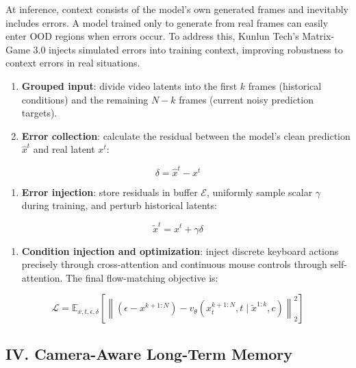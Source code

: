 At inference, context consists of the model's own generated frames and inevitably includes errors. A model trained only to generate from real frames can easily enter OOD regions when errors occur. To address this, Kunlun Tech's Matrix-Game 3.0 injects simulated errors into training context, improving robustness to context errors in real situations.

\begin{enumerate}
\def\labelenumi{\arabic{enumi}.}
\item
  \textbf{Grouped input}: divide video latents into the first \(k\) frames (historical conditions) and the remaining \(N-k\) frames (current noisy prediction targets).
\item
{}
  \textbf{Error collection}: calculate the residual between the model's clean prediction \(\hat{x}^t\) and real latent \(x^t\):
\end{enumerate}

\[
\delta = \hat{x}^t - x^t
\]

\begin{enumerate}
\def\labelenumi{\arabic{enumi}.}
\setcounter{enumi}{2}
\tightlist
\item
{}
  \textbf{Error injection}: store residuals in buffer \(\mathcal{E}\), uniformly sample scalar \(\gamma\) during training, and perturb historical latents:
\end{enumerate}

\[
\tilde{x}^t = x^t + \gamma\delta
\]

\begin{enumerate}
\def\labelenumi{\arabic{enumi}.}
\setcounter{enumi}{3}
\tightlist
\item
{}
  \textbf{Condition injection and optimization}: inject discrete keyboard actions precisely through cross-attention and continuous mouse controls through self-attention. The final flow-matching objective is:
\end{enumerate}

\[
\mathcal{L} = \mathbb{E}_{x,t,\epsilon,\delta}\left[\left\|\left(\epsilon - x^{k+1:N}\right) - v_{\theta}\left(x_t^{k+1:N}, t\mid \tilde{x}^{1:k}, c\right)\right\|_2^2\right]
\]

\hypertarget{iv.-camera-aware-long-term-memory}{%
\subsection{IV. Camera-Aware Long-Term Memory}\label{iv.-camera-aware-long-term-memory}}

